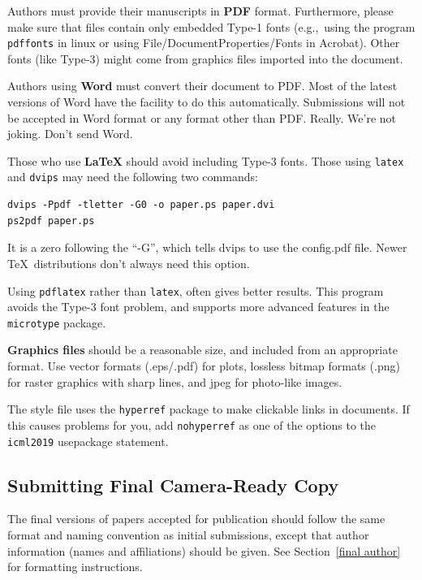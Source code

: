 \documentclass{article}
\begin{document}
\medskip

Authors must provide their manuscripts in \textbf{PDF} format.
Furthermore, please make sure that files contain only embedded Type-1 fonts
(e.g.,~using the program \texttt{pdffonts} in linux or using
File/DocumentProperties/Fonts in Acrobat). Other fonts (like Type-3)
might come from graphics files imported into the document.

Authors using \textbf{Word} must convert their document to PDF\@. Most
of the latest versions of Word have the facility to do this
automatically. Submissions will not be accepted in Word format or any
format other than PDF\@. Really. We're not joking. Don't send Word.

Those who use \textbf{\LaTeX} should avoid including Type-3 fonts.
Those using \texttt{latex} and \texttt{dvips} may need the following
two commands:

{\footnotesize
\begin{verbatim}
dvips -Ppdf -tletter -G0 -o paper.ps paper.dvi
ps2pdf paper.ps
\end{verbatim}}
It is a zero following the ``-G'', which tells dvips to use
the config.pdf file. Newer \TeX\ distributions don't always need this
option.

Using \texttt{pdflatex} rather than \texttt{latex}, often gives better
results. This program avoids the Type-3 font problem, and supports more
advanced features in the \texttt{microtype} package.

\textbf{Graphics files} should be a reasonable size, and included from
an appropriate format. Use vector formats (.eps/.pdf) for plots,
lossless bitmap formats (.png) for raster graphics with sharp lines, and
jpeg for photo-like images.

The style file uses the \texttt{hyperref} package to make clickable
links in documents. If this causes problems for you, add
\texttt{nohyperref} as one of the options to the \texttt{icml2019}
usepackage statement.


\subsection{Submitting Final Camera-Ready Copy}

The final versions of papers accepted for publication should follow the
same format and naming convention as initial submissions, except that
author information (names and affiliations) should be given. See
Section~\ref{final author} for formatting instructions.
\end{document}
